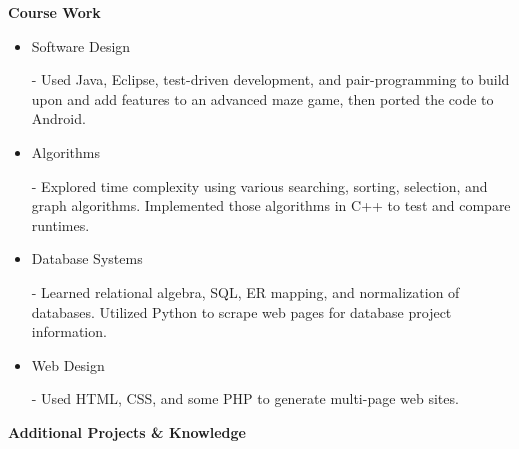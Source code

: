 \documentclass[11pt]{article}
\begin{document}
\begin{LARGE}
	\bf Course Work
\end{LARGE}

\vspace{-0.5em}

\begin{itemize}
	\item \begin{large}\begin{bf}Software Design\end{bf}\end{large} - Used Java, Eclipse, test-driven development, and pair-programming to build upon and add features to an advanced maze game, then ported the code to Android.
	\vspace{-0.5em}
	\item \begin{large}\begin{bf}Algorithms\end{bf}\end{large} - Explored time complexity using various searching, sorting, selection, and graph algorithms. Implemented those algorithms in C++ to test and compare runtimes.
	\vspace{-0.5em}
	\item \begin{large}\begin{bf}Database Systems\end{bf}\end{large} - Learned relational algebra, SQL, ER mapping, and normalization of databases. Utilized Python to scrape web pages for database project information.
	\vspace{-0.5em}
	\item \begin{large}\begin{bf}Web Design\end{bf}\end{large} - Used HTML, CSS, and some PHP to generate multi-page web sites.
\end{itemize}

\vspace{-0.3em}

\begin{LARGE}
	\bf Additional Projects \& Knowledge
\end{LARGE}

\vspace{-0.5em}
\end{document}
